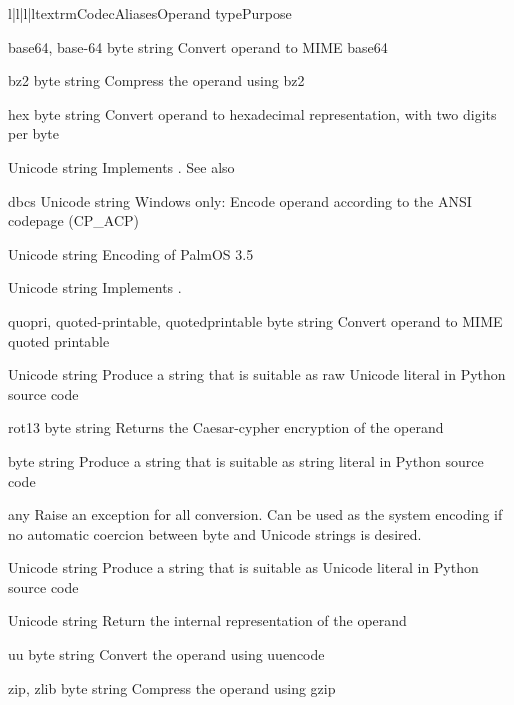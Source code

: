 \begin{tableiv}{l|l|l|l}{textrm}{Codec}{Aliases}{Operand type}{Purpose}

         {base64, base-64}
         {byte string}
         {Convert operand to MIME base64}

         {bz2}
         {byte string}
         {Compress the operand using bz2}

         {hex}
         {byte string}
         {Convert operand to hexadecimal representation, with two
          digits per byte}

         {}
         {Unicode string}
         {Implements .
          See also }

         {dbcs}
         {Unicode string}
         {Windows only: Encode operand according to the ANSI codepage (CP_ACP)}

         {}
         {Unicode string}
         {Encoding of PalmOS 3.5}

         {}
         {Unicode string}
         {Implements .
          }

         {quopri, quoted-printable, quotedprintable}
         {byte string}
         {Convert operand to MIME quoted printable}

         {}
         {Unicode string}
         {Produce a string that is suitable as raw Unicode literal in
          Python source code}

         {rot13}
         {byte string}
         {Returns the Caesar-cypher encryption of the operand}

         {}
         {byte string}
         {Produce a string that is suitable as string literal in
          Python source code}

         {}
         {any}
         {Raise an exception for all conversion. Can be used as the
          system encoding if no automatic coercion between byte and
          Unicode strings is desired.} 

         {}
         {Unicode string}
         {Produce a string that is suitable as Unicode literal in
          Python source code}

         {}
         {Unicode string}
         {Return the internal representation of the operand}

         {uu}
         {byte string}
         {Convert the operand using uuencode}

         {zip, zlib}
         {byte string}
         {Compress the operand using gzip}

\end{tableiv}

